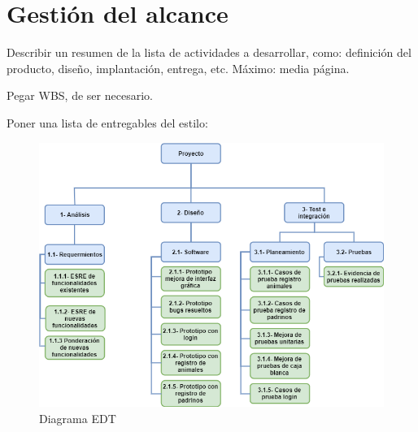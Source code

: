 \section{Gestión del alcance}
Describir un resumen de la lista de actividades a desarrollar, como: definición del producto, diseño, implantación, entrega, etc.
Máximo: media página. 

Pegar WBS, de ser necesario.

Poner una lista de entregables del estilo:


\begin{figure}[H]
    \centering
    \includegraphics[scale=0.6]{Files/edtv3.png}
    \caption{Diagrama EDT}
    \label{fig:clases}
\end{figure}
